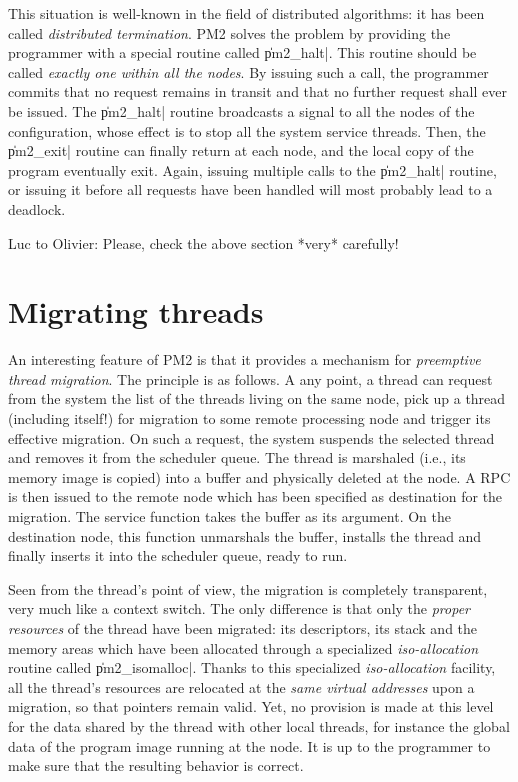 This situation is well-known in the field of distributed algorithms:
it has been called \emph{distributed termination}. PM2 solves the
problem by providing the programmer with a special routine called
\|pm2_halt|.  This routine should be called \emph{exactly one within
  all the nodes}. By issuing such a call, the programmer commits that
no request remains in transit and that no further request shall ever
be issued. The \|pm2_halt| routine broadcasts a signal to all the
nodes of the configuration, whose effect is to stop all the system
service threads. Then, the \|pm2_exit| routine can finally return at each
node, and the local copy of the program eventually exit. Again,
issuing multiple calls to the \|pm2_halt| routine, or issuing it
before all requests have been handled will most probably lead to a
deadlock.

\begin{note}
  Luc to Olivier: Please, check the above section *very* carefully!
\end{note}

\section{Migrating threads}

An interesting feature of PM2 is that it provides a mechanism for
\emph{preemptive thread migration}. The principle is as follows. A any
point, a thread can request from the system the list of the threads
living on the same node, pick up a thread (including itself!)  for
migration to some remote processing node and trigger its effective
migration.  On such a request, the system suspends the selected thread
and removes it from the scheduler queue. The thread is marshaled
(i.e., its memory image is copied) into a buffer and physically
deleted at the node. A RPC is then issued to the remote node which has
been specified as destination for the migration. The service function
takes the buffer as its argument. On the destination node, this
function unmarshals the buffer, installs the thread and finally
inserts it into the scheduler queue, ready to run.

Seen from the thread's point of view, the migration is completely
transparent, very much like a context switch. The only difference is
that only the \emph{proper resources} of the thread have been
migrated: its descriptors, its stack and the memory areas which have
been allocated through a specialized \emph{iso-allocation} routine
called \|pm2_isomalloc|.  Thanks to this specialized
\emph{iso-allocation} facility, all the thread's resources are
relocated at the \emph{same virtual addresses} upon a migration, so
that pointers remain valid.  Yet, no provision is made at this level
for the data shared by the thread with other local threads, for
instance the global data of the program image running at the node. It
is up to the programmer to make sure that the resulting behavior is
correct.


